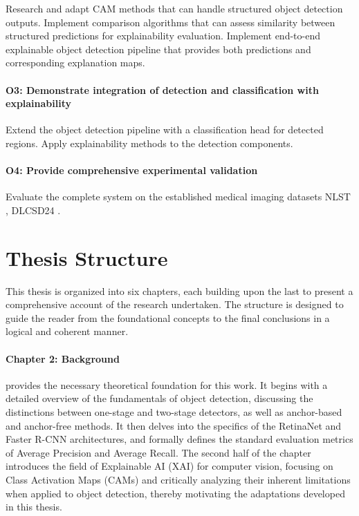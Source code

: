 Research and adapt CAM methods that can handle structured object detection outputs.
Implement comparison algorithms that can assess similarity between structured predictions for explainability evaluation.
Implement end-to-end explainable object detection pipeline that provides both predictions and corresponding explanation maps.

\paragraph{O3: Demonstrate integration of detection and classification with explainability}

Extend the object detection pipeline with a classification head for detected regions.
Apply explainability methods to the detection components.

\paragraph{O4: Provide comprehensive experimental validation}
Evaluate the complete system on the established medical imaging datasets NLST \cite{nlst_data}, DLCSD24 \cite{dlcsd24, tushar2025ailunghealthbenchmarking}. 

\section{Thesis Structure}
\label{sec:thesis_structure}

This thesis is organized into six chapters, each building upon the last to present a comprehensive account of the research undertaken. The structure is designed to guide the reader from the foundational concepts to the final conclusions in a logical and coherent manner.

\paragraph{Chapter 2: Background} provides the necessary theoretical foundation for this work. It begins with a detailed overview of the fundamentals of object detection, discussing the distinctions between one-stage and two-stage detectors, as well as anchor-based and anchor-free methods. It then delves into the specifics of the RetinaNet and Faster R-CNN architectures, and formally defines the standard evaluation metrics of Average Precision and Average Recall. The second half of the chapter introduces the field of Explainable AI (XAI) for computer vision, focusing on Class Activation Maps (CAMs) and critically analyzing their inherent limitations when applied to object detection, thereby motivating the adaptations developed in this thesis.

